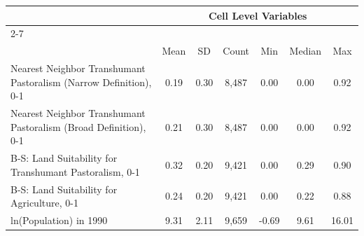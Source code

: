 {
\def\sym#1{\ifmmode^{#1}\else\(^{#1}\)\fi}
\begin{tabular}{l*{1}{cccccc}}
\toprule
     &\multicolumn{6}{c}{Cell Level Variables}                                     \\\cmidrule(lr){2-7}
     &\multicolumn{6}{c}{}                                                         \\
     &        Mean&          SD&       Count&         Min&      Median&         Max\\
\midrule
Nearest Neighbor Transhumant Pastoralism (Narrow Definition), 0-1&        0.19&        0.30&       8,487&        0.00&        0.00&        0.92\\
Nearest Neighbor Transhumant Pastoralism (Broad Definition), 0-1&        0.21&        0.30&       8,487&        0.00&        0.00&        0.92\\
B-S: Land Suitability for Transhumant Pastoralism, 0-1&        0.32&        0.20&       9,421&        0.00&        0.29&        0.90\\
B-S: Land Suitability for Agriculture, 0-1&        0.24&        0.20&       9,421&        0.00&        0.22&        0.88\\
ln(Population) in 1990&        9.31&        2.11&       9,659&       -0.69&        9.61&       16.01\\
\bottomrule
\end{tabular}
}
